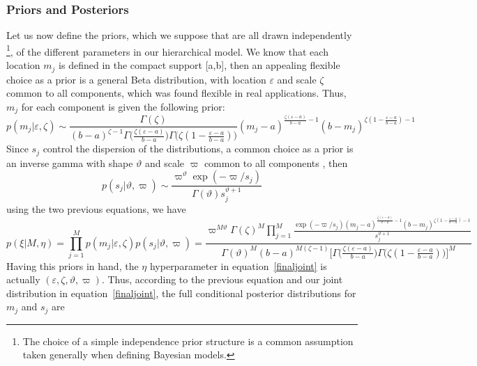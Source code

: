 \documentclass[journal,10pt]{elsart}
\begin{document}
\subsubsection{Priors and Posteriors}
Let us now define the priors, which we suppose that are all drawn independently \footnote{The choice of a simple independence prior structure is a common assumption taken generally when defining Bayesian models.}, of the different parameters in our hierarchical model. We know that each location $m_{j}$ is defined in the compact support [a,b], then an appealing flexible choice as a prior is a general Beta distribution, with location $\varepsilon$ and scale $\zeta$ common to all components, which was found flexible in real applications. Thus, ${m}_j$ for each component is given the following prior:
\begin{equation}\label{priorm}
p({m}_j|\varepsilon,\zeta) \sim  \frac{\Gamma(\zeta)}{(b-a)^{\zeta-1}\Gamma\big(\frac{\zeta(\varepsilon-a)}{b-a}\big)\Gamma\big(\zeta(1-\frac{\varepsilon-a}{b-a})\big)}({m}_j-a)^{\frac{\zeta(\varepsilon-a)}{b-a}-1}(b-{m}_j)^{\zeta(1-\frac{\varepsilon-a}{b-a})-1}
\end{equation}
Since $s_j$ control the
dispersion of the distributions, a common choice as a prior is an
inverse gamma with shape $\vartheta$ and scale $\varpi$ common to all
components \cite{Carlin2000}, then
\begin{equation}\label{priors}
p(s_j|\vartheta,\varpi) \sim \frac{\varpi^\vartheta\exp(-\varpi/
s_j)}{\Gamma(\vartheta)s_j^{\vartheta+1}}
\end{equation}
using the two previous equations, we have
\begin{equation}\label{priormeansum}
p(\xi|M,\eta)=\prod_{j=1}^M p({m}_j|\varepsilon,\zeta)p(s_j|\vartheta,\varpi)
=\frac{\varpi^{M\vartheta}\Gamma(\zeta)^M\prod_{j=1}^M \frac{\exp(-\varpi/
s_j)({m}_j-a)^{\frac{\zeta(\varepsilon-a)}{b-a}-1}(b-{m}_j)^{\zeta(1-\frac{\varepsilon-a}{b-a})-1}}{s_j^{\vartheta+1}}}{\Gamma(\vartheta)^M(b-a)^{M(\zeta-1)}\bigg[\Gamma\big(\frac{\zeta(\varepsilon-a)}{b-a}\big)\Gamma\big(\zeta(1-\frac{\varepsilon-a}{b-a})\big)\bigg]^M}
\end{equation}
Having this priors in hand, the $\eta$ hyperparameter in equation~\ref{finaljoint} is actually $(\varepsilon,\zeta,\vartheta,\varpi)$. Thus, according to the previous equation and our joint distribution in equation~\ref{finaljoint}, the full conditional posterior distributions for $m_j$ and $s_j$ are
\end{document}
